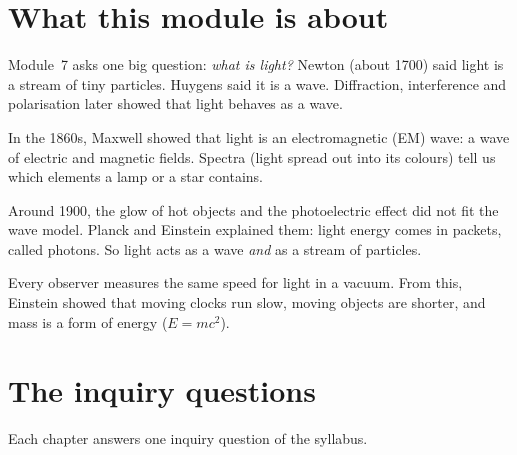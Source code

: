 \makecover
{}
\tableofcontents


\newcommand\ovSheetYes{\textcolor{hscformula}{\footnotesize\bfseries\faCheck\ Yes}}
\newcommand\ovSheetNo{\textcolor{hscmistake}{\footnotesize\bfseries\faTimes\ Learn it}}
\newcommand\ovSheetCombine{\textcolor{hsctiptext}{\footnotesize\bfseries\faLink\ Combine}}
\newcommand\ovPad[2]{\rule[-#2]{0pt}{0pt}\rule{0pt}{#1}}

\section*{What this module is about}

Module~7 asks one big question: \emph{what is light?} Newton (about 1700) said light is a
stream of tiny particles. Huygens said it is a wave. Diffraction, interference and
polarisation later showed that light behaves as a wave.

In the 1860s, Maxwell showed that light is an electromagnetic (EM) wave: a wave of electric
and magnetic fields. Spectra (light spread out into its colours) tell us which elements a
lamp or a star contains.

Around 1900, the glow of hot objects and the photoelectric effect did not fit the wave model.
Planck and Einstein explained them: light energy comes in packets, called photons. So light
acts as a wave \emph{and} as a stream of particles.

Every observer measures the same speed for light in a vacuum. From this, Einstein showed that moving
clocks run slow, moving objects are shorter, and mass is a form of energy ($E = mc^2$).

\section*{The inquiry questions}

Each chapter answers one inquiry question of the syllabus.

